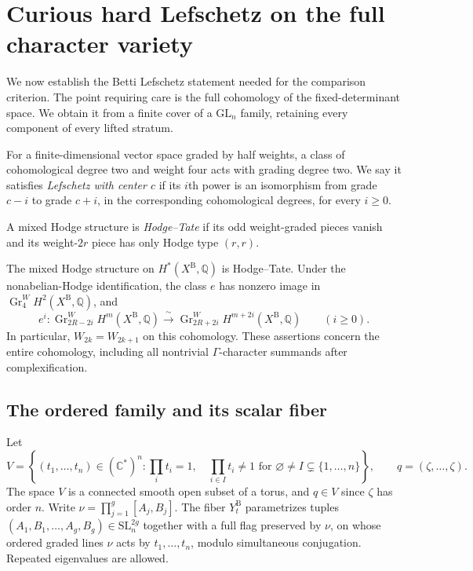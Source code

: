 \section{Curious hard Lefschetz on the full character variety}
\label{sec:betti}

We now establish the Betti Lefschetz statement needed for the comparison
criterion.  The point requiring care is the full cohomology of the
fixed-determinant space.  We obtain it from a finite cover of a
$\mathrm{GL}_n$ family, retaining every component of every lifted stratum.

For a finite-dimensional vector space graded by half weights, a class of
cohomological degree two and weight four acts with grading degree two.
We say it satisfies \emph{Lefschetz with center $c$} if its $i$th power
is an isomorphism from grade $c-i$ to grade $c+i$, in the corresponding
cohomological degrees, for every $i\geq0$.

A mixed Hodge structure is \emph{Hodge--Tate} if its odd weight-graded
pieces vanish and its weight-$2r$ piece has only Hodge type $(r,r)$.

\begin{theorem}\label{betti:lefschetz}
The mixed Hodge structure on $H^*(X^{\mathrm B},\mathbb Q)$ is Hodge--Tate.
Under the nonabelian-Hodge identification, the class $e$ has nonzero image
in $\operatorname{Gr}^W_4H^2(X^{\mathrm B},\mathbb Q)$, and
\[
 e^i:\operatorname{Gr}^W_{2R-2i}H^m(X^{\mathrm B},\mathbb Q)
 \xrightarrow{\ \sim\ }
 \operatorname{Gr}^W_{2R+2i}H^{m+2i}(X^{\mathrm B},\mathbb Q)
 \qquad(i\geq0).
\]
In particular, $W_{2k}=W_{2k+1}$ on this cohomology.  These assertions
concern the entire cohomology, including all nontrivial
$\Gamma$-character summands after complexification.
\end{theorem}

\subsection{The ordered family and its scalar fiber}

Let
\[
 V=\left\{(t_1,\ldots,t_n)\in(\mathbb C^*)^n:
 \prod_i t_i=1,\quad
 \prod_{i\in I}t_i\ne1\text{ for }\varnothing\ne I\subsetneq\{1,\ldots,n\}
 \right\},
 \qquad q=(\zeta,\ldots,\zeta).
\]
The space $V$ is a connected smooth open subset of a torus, and $q\in V$
since $\zeta$ has order $n$.  Write $\nu=\prod_{j=1}^g[A_j,B_j]$.
The fiber $Y^{\mathrm B}_t$ parametrizes tuples
$(A_1,B_1,\ldots,A_g,B_g)\in\mathrm{SL}_n^{2g}$ together with a full flag
preserved by $\nu$, on whose ordered graded lines $\nu$ acts by
$t_1,\ldots,t_n$, modulo simultaneous conjugation.  Repeated eigenvalues
are allowed.

